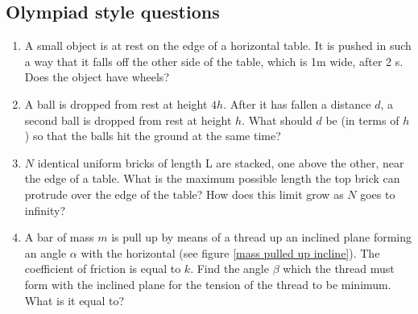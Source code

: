 \documentclass{article}
\begin{document}
\subsection{Olympiad style questions}
\begin{enumerate}
\item A small object is at rest on the edge of a horizontal table. It is pushed in such a way that it falls off the other side of the table, which is 1m wide, after 2 s. Does the object have wheels?

\item A ball is dropped from rest at height $4h$. After it has fallen a distance $d$, a second ball is
dropped from rest at height $h$. What should $d$ be (in terms of $h$) so that the balls hit the
ground at the same time?

\item $N$ identical uniform bricks of length L are stacked, one above the other, near the edge
of a table. What is the maximum possible length the top brick can protrude over the edge of the
table? How does this limit grow as $N$ goes to infinity?

\item A bar of mass $m$ is pull up by means of a thread up an inclined plane forming an angle $\alpha$ with the horizontal (see figure \ref{mass pulled up incline}). The coefficient of friction is equal to $k$. Find the angle $\beta$ which the thread must form with the inclined plane for the tension of the thread to be minimum. What is it equal to?
\end{enumerate}
\end{document}

